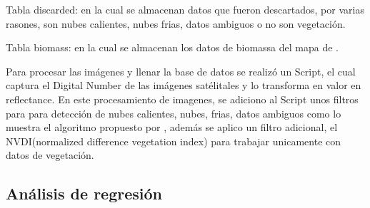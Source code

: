 Tabla discarded: en la cual se almacenan datos que fueron descartados, por varias rasones,
son nubes calientes, nubes frias, datos ambiguos o no son vegetación.

Tabla biomass: en la cual se almacenan los datos de biomassa del mapa de \cite{baccini2012estimated}.

Para procesar las imágenes y llenar la base de datos se realizó un Script, el cual captura el Digital Number
de las imágenes satélitales y lo transforma en valor en reflectance. En este procesamiento de imagenes, se adiciono al Script unos filtros para para detección de nubes calientes,
nubes, frias, datos ambiguos como lo muestra el algoritmo propuesto por \cite{irish2000landsat}, además se aplico 
un filtro adicional, el NVDI(normalized difference vegetation index) para trabajar unicamente con datos de vegetación.

\subsection{Análisis de regresión}








